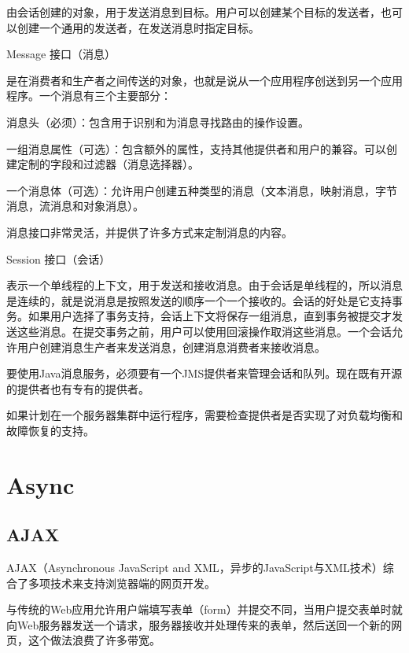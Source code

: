 \begin{compactitem}
由会话创建的对象，用于发送消息到目标。用户可以创建某个目标的发送者，也可以创建一个通用的发送者，在发送消息时指定目标。



\item Message 接口（消息）

是在消费者和生产者之间传送的对象，也就是说从一个应用程序创送到另一个应用程序。一个消息有三个主要部分：

\begin{compactenum}
\item 消息头（必须）：包含用于识别和为消息寻找路由的操作设置。
\item 一组消息属性（可选）：包含额外的属性，支持其他提供者和用户的兼容。可以创建定制的字段和过滤器（消息选择器）。
\item 一个消息体（可选）：允许用户创建五种类型的消息（文本消息，映射消息，字节消息，流消息和对象消息）。
\end{compactenum}

消息接口非常灵活，并提供了许多方式来定制消息的内容。

\item Session 接口（会话）

表示一个单线程的上下文，用于发送和接收消息。由于会话是单线程的，所以消息是连续的，就是说消息是按照发送的顺序一个一个接收的。会话的好处是它支持事务。如果用户选择了事务支持，会话上下文将保存一组消息，直到事务被提交才发送这些消息。在提交事务之前，用户可以使用回滚操作取消这些消息。一个会话允许用户创建消息生产者来发送消息，创建消息消费者来接收消息。

\end{compactitem}

要使用Java消息服务，必须要有一个JMS提供者来管理会话和队列。现在既有开源的提供者也有专有的提供者。

如果计划在一个服务器集群中运行程序，需要检查提供者是否实现了对负载均衡和故障恢复的支持。

\section{Async}


\subsection{AJAX}

AJAX（Asynchronous JavaScript and XML，异步的JavaScript与XML技术）综合了多项技术来支持浏览器端的网页开发。

与传统的Web应用允许用户端填写表单（form）并提交不同，当用户提交表单时就向Web服务器发送一个请求，服务器接收并处理传来的表单，然后送回一个新的网页，这个做法浪费了许多带宽。

